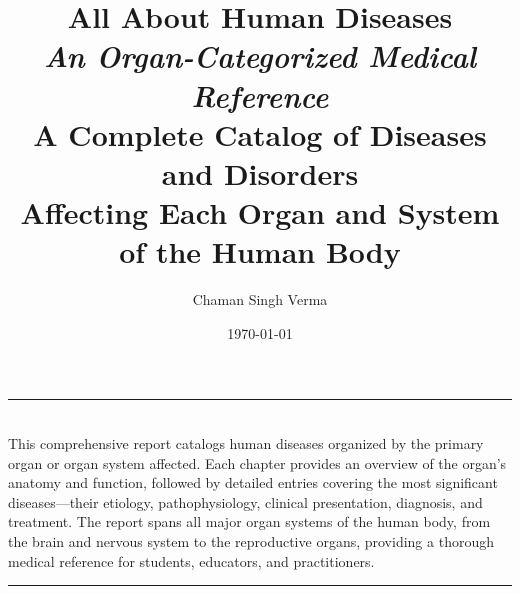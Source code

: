 \documentclass[12pt,a4paper,twoside]{book}
\title{%
  \vspace{-1cm}
  {\Huge\bfseries All About Human Diseases}\\[1em]
  {\Large\itshape An Organ-Categorized Medical Reference}\\[0.5em]
  {\normalsize A Complete Catalog of Diseases and Disorders\\
   Affecting Each Organ and System of the Human Body}
}
\author{Chaman Singh Verma}
\date{\today}
\begin{document}


\frontmatter

\maketitle
\thispagestyle{empty}

\vfill
\begin{center}
\rule{0.6\textwidth}{0.4pt}\\[12pt]
{\small
This comprehensive report catalogs human diseases organized by the primary
organ or organ system affected. Each chapter provides an overview of the
organ's anatomy and function, followed by detailed entries covering the
most significant diseases---their etiology, pathophysiology, clinical
presentation, diagnosis, and treatment. The report spans all major organ
systems of the human body, from the brain and nervous system to the
reproductive organs, providing a thorough medical reference for students,
educators, and practitioners.}
\\[12pt]
\rule{0.6\textwidth}{0.4pt}
\end{center}
\vfill

\tableofcontents


\mainmatter
\end{document}
